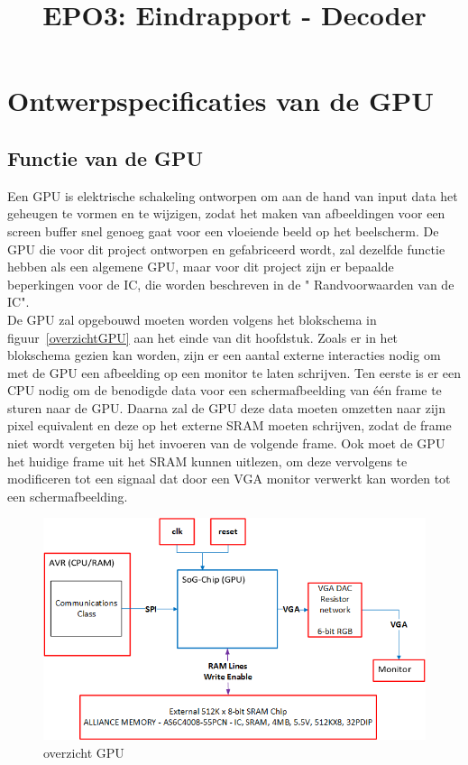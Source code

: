 \documentclass{scrartcl} %
\author{}
\title{EPO3: Eindrapport - Decoder}
\begin{document}
\chapter{Ontwerpspecificaties van de GPU}
\label{ch:spec}

\section {Functie van de GPU}
Een GPU is elektrische schakeling ontworpen om aan de hand van input data het geheugen te vormen en te wijzigen, zodat het maken van afbeeldingen voor een screen buffer snel genoeg gaat voor een vloeiende beeld op het beelscherm. De GPU die voor  dit project ontworpen en gefabriceerd wordt, zal dezelfde functie hebben als een algemene GPU, maar voor dit project zijn er bepaalde beperkingen voor de IC, die worden beschreven in de " Randvoorwaarden van de IC".
\\De GPU zal opgebouwd moeten worden volgens het blokschema in figuur~\ref{overzichtGPU} aan het einde van dit hoofdstuk.
Zoals er in het blokschema gezien kan worden, zijn er een aantal externe interacties nodig om met de GPU een afbeelding op een monitor te laten schrijven. Ten eerste is er een CPU nodig om de benodigde data voor een schermafbeelding van één frame te sturen naar de GPU. Daarna zal de GPU deze data moeten omzetten naar zijn pixel equivalent en deze op het externe SRAM moeten schrijven, zodat de frame niet wordt vergeten bij het invoeren van de volgende frame. Ook moet de GPU het huidige frame uit het SRAM kunnen uitlezen, om deze vervolgens te modificeren tot een signaal dat door een VGA monitor verwerkt kan worden tot een schermafbeelding.

\begin{figure}[H]
\centering
        \includegraphics[scale=0.9]{Resource/system_overview.png}
        \caption{overzicht GPU}
        \label{fig:overzichtGPU}
\end{figure} 
\end{document}
